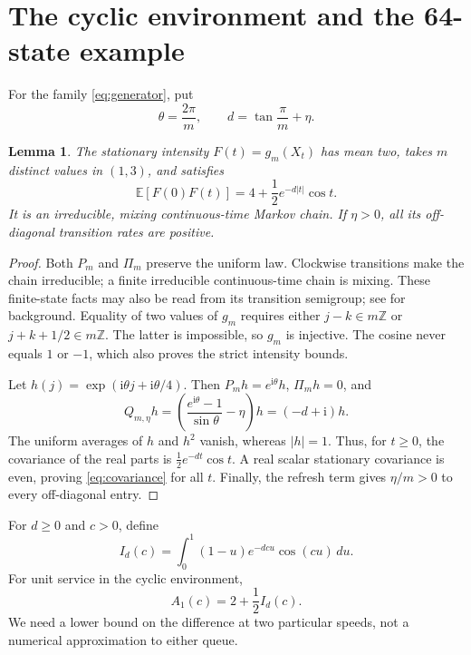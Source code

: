 \documentclass[aap,preprint]{imsart}
\numberwithin{equation}{section}
\theoremstyle{plain}
\newtheorem{lemma}[theorem]{Lemma}
\theoremstyle{definition}
\newcommand{\E}{\mathbb E}
\newcommand{\Z}{\mathbb Z}
\newcommand{\1}{\mathbf 1}
\newcommand{\ii}{\mathrm i}
\begin{document}
\section{The cyclic environment and the 64-state example}\label{sec:cycle}
For the family \eqref{eq:generator}, put
\begin{equation}\label{eq:delta}
 \theta=\frac{2\pi}{m},\qquad d=\tan\frac\pi m+\eta.
\end{equation}
\begin{lemma}\label{lem:cycle}
The stationary intensity $F(t)=g_m(X_t)$ has mean two, takes $m$ distinct values in $(1,3)$, and satisfies
\begin{equation}\label{eq:covariance}
 \E[F(0)F(t)]=4+\frac12e^{-d|t|}\cos t.
\end{equation}
It is an irreducible, mixing continuous-time Markov chain. If $\eta>0$, all its off-diagonal transition rates are positive.
\end{lemma}
\begin{proof}
Both $P_m$ and $\Pi_m$ preserve the uniform law. Clockwise transitions make the chain irreducible; a finite irreducible continuous-time chain is mixing. These finite-state facts may also be read from its transition semigroup; see \cite{Norris97} for background. Equality of two values of $g_m$ requires either $j-k\in m\Z$ or $j+k+1/2\in m\Z$. The latter is impossible, so $g_m$ is injective. The cosine never equals $1$ or $-1$, which also proves the strict intensity bounds.

Let $h(j)=\exp(\ii\theta j+\ii\theta/4)$. Then $P_mh=e^{\ii\theta}h$, $\Pi_mh=0$, and
\[
 Q_{m,\eta}h=\left(\frac{e^{\ii\theta}-1}{\sin\theta}-\eta\right)h=(-d+\ii)h.
\]
The uniform averages of $h$ and $h^2$ vanish, whereas $|h|=1$. Thus, for $t\ge0$, the covariance of the real parts is $\tfrac12e^{-dt}\cos t$. A real scalar stationary covariance is even, proving \eqref{eq:covariance} for all $t$. Finally, the refresh term gives $\eta/m>0$ to every off-diagonal entry.
\end{proof}
For $d\ge0$ and $c>0$, define
\begin{equation}\label{eq:Id}
 I_d(c)=\int_0^1(1-u)e^{-dcu}\cos(cu)\,du.
\end{equation}
For unit service in the cyclic environment,
\begin{equation}\label{eq:Aunit}
 A_1(c)=2+\frac12I_d(c).
\end{equation}
We need a lower bound on the difference at two particular speeds, not a numerical approximation to either queue.
\end{document}
